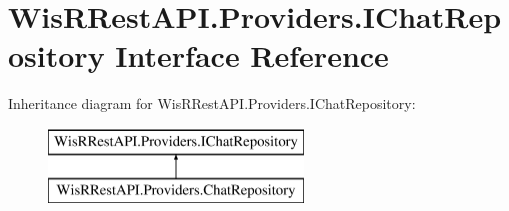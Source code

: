 \hypertarget{interface_wis_r_rest_a_p_i_1_1_providers_1_1_i_chat_repository}{}\section{Wis\+R\+Rest\+A\+P\+I.\+Providers.\+I\+Chat\+Repository Interface Reference}
\label{interface_wis_r_rest_a_p_i_1_1_providers_1_1_i_chat_repository}
Inheritance diagram for Wis\+R\+Rest\+A\+P\+I.\+Providers.\+I\+Chat\+Repository\+:\begin{figure}[H]
\begin{center}
\leavevmode
\includegraphics[height=2.000000cm]{interface_wis_r_rest_a_p_i_1_1_providers_1_1_i_chat_repository}
\end{center}
\end{figure}
